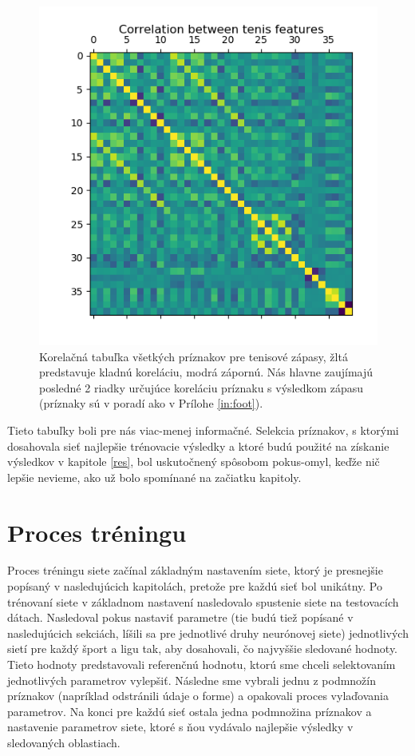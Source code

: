 \begin{figure} \label{corr_atp}
\includegraphics[scale=0.9]{../img/corratp.png}
\caption{Korelačná tabuľka všetkých príznakov pre tenisové zápasy, žltá predstavuje kladnú koreláciu, modrá zápornú. Nás hlavne zaujímajú posledné 2 riadky určujúce koreláciu príznaku s výsledkom zápasu (príznaky sú v poradí ako v Prílohe \ref{in:foot}).}
\end{figure}

Tieto tabuľky boli pre nás viac-menej informačné. 
Selekcia príznakov, s ktorými dosahovala sieť najlepšie trénovacie výsledky a ktoré budú použité na získanie výsledkov v kapitole \ref{res}, bol uskutočnený spôsobom pokus-omyl, keďže nič lepšie nevieme, ako už bolo spomínané na začiatku kapitoly.

\section{Proces tréningu}
Proces tréningu siete začínal základným nastavením siete, ktorý je presnejšie popísaný v nasledujúcich kapitolách, pretože pre každú sieť bol unikátny.
Po trénovaní siete v základnom nastavení nasledovalo spustenie siete na testovacích dátach.
Nasledoval pokus nastaviť parametre (tie budú tiež popísané v nasledujúcich sekciách, líšili sa pre jednotlivé druhy neurónovej siete) jednotlivých sietí pre každý šport a ligu tak, aby dosahovali, čo najvyššie sledované hodnoty.
Tieto hodnoty predstavovali referenčnú hodnotu, ktorú sme chceli selektovaním jednotlivých parametrov vylepšiť.
Následne sme vybrali jednu z podmnožín príznakov (napríklad odstránili údaje o forme) a opakovali proces vylaďovania parametrov.
Na konci pre každú sieť ostala jedna podmnožina príznakov a nastavenie parametrov siete, ktoré s ňou vydávalo najlepšie výsledky v sledovaných oblastiach.

